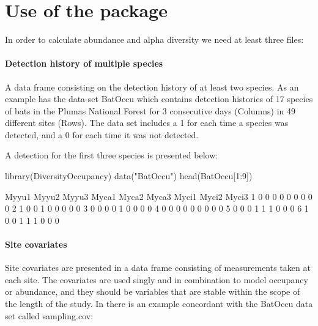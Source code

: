 \documentclass[article]{jss}
\begin{document}
\section{Use of the package}\label{use-of-the-package}

In order to calculate abundance and alpha diversity we need at least
three files:

\paragraph{Detection history of multiple
species}\label{detection-history-of-multiple-species}

A data frame consisting on the detection history of at least two
species. As an example  has the data-set BatOccu
which contains detection histories of 17 species of bats in the Plumas
National Forest for 3 consecutive days (Columns) in 49 different sites
(Rows). The data set includes a 1 for each time a species was detected,
and a 0 for each time it was not detected.

A detection for the first three species is presented below:

\begin{CodeChunk}
\begin{CodeInput}
library(DiversityOccupancy)
data("BatOccu")
head(BatOccu[1:9])
\end{CodeInput}
\begin{CodeOutput}
  Myyu1 Myyu2 Myyu3 Myca1 Myca2 Myca3 Myci1 Myci2 Myci3
1     0     0     0     0     0     0     0     0     0
2     1     0     0     1     0     0     0     0     0
3     0     0     0     0     1     0     0     0     0
4     0     0     0     0     0     0     0     0     0
5     0     0     0     1     1     1     0     0     0
6     1     0     0     1     1     1     0     0     0
\end{CodeOutput}
\end{CodeChunk}

\paragraph{Site covariates}\label{site-covariates}

Site covariates are presented in a data frame consisting of measurements
taken at each site. The covariates are used singly and in combination to
model occupancy or abundance, and they should be variables that are
stable within the scope of the length of the study. In
 there is an example concordant with the BatOccu
data set called sampling.cov:
\end{document}

